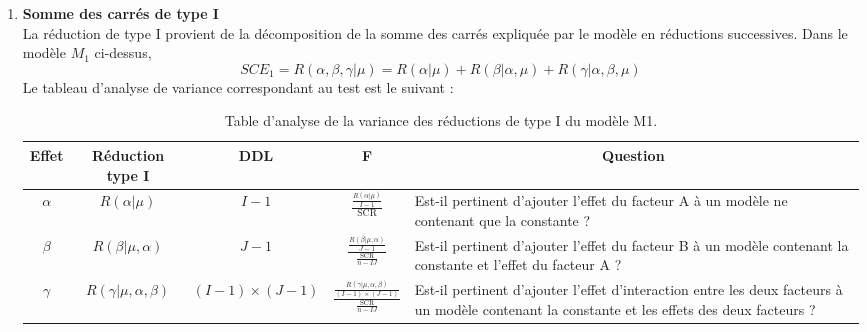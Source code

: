 \documentclass[12pt,a4paper]{report}
\begin{document}
	\begin{enumerate}[label=\alph*)]
		\item \textbf{Somme des carrés de type I}\\
		La réduction de type I provient de la décomposition de la somme des carrés expliquée par le modèle en réductions successives. Dans le modèle $M_1$ ci-dessus,
		\begin{equation}
			SCE_1 = R(\alpha,\beta,\gamma|\mu) = R(\alpha|\mu) + R(\beta|\alpha,\mu) + R(\gamma|\alpha,\beta,\mu)
		\end{equation}
		Le tableau d'analyse de variance correspondant au test est le suivant : 
		\begin{table}[H]
			\centering
			\begin{adjustbox}{width=\textwidth}
				\begin{tabular}{|c|c|c|c|p{8cm}|}
					\hline
					\multicolumn{1}{|c|}{\textbf{Effet}} & \multicolumn{1}{c|}{\textbf{Réduction type I}} & \multicolumn{1}{c|}{\textbf{DDL}} & \multicolumn{1}{c|}{\textbf{F}} & \multicolumn{1}{c|}{\textbf{Question}} \\ \hline
					$\alpha$ & $R(\alpha|\mu)$ & $I-1$ & \large{$\frac{\frac{R(\alpha|\mu)}{I-1}}{\text{SCR}}$} & Est-il pertinent d'ajouter l'effet du facteur A à un modèle ne contenant que la constante ? \\ \hline
					$\beta$ & $R(\beta|\mu, \alpha)$ & $J-1$ & \large{$\frac{\frac{R(\beta|\mu, \alpha)}{J-1}}{\frac{\text{SCR}}{n-IJ}}$} & Est-il pertinent d'ajouter l'effet du facteur B à un modèle contenant la constante et l'effet du facteur A ? \\ \hline
					$\gamma$ & $R(\gamma|\mu, \alpha, \beta)$ & $(I-1) \times (J-1)$ & \large{$\frac{\frac{R(\gamma|\mu, \alpha, \beta)}{(I-1) \times (J-1)}}{\frac{\text{SCR}}{n-IJ}}$} & Est-il pertinent d'ajouter l'effet d'interaction entre les deux facteurs à un modèle contenant la constante et les effets des deux facteurs ? \\ \hline
				\end{tabular}
			\end{adjustbox}
			\caption{Table d'analyse de la variance des réductions de type I du modèle M1.}
		\end{table}
		

\end{enumerate}
\end{document}
